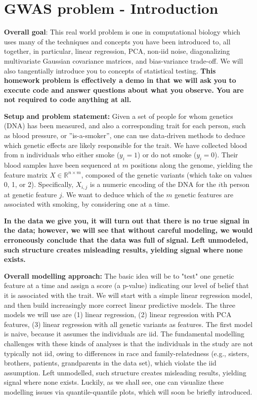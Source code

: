 \documentclass[11pt]{article}
\begin{document}
    \section{GWAS problem - Introduction}\label{gwas-problem---introduction}

    \textbf{Overall goal}: This real world problem is one in computational
biology which uses many of the techniques and concepts you have been
introduced to, all together, in particular, linear regression, PCA,
non-iid noise, diagonalizing multivariate Gaussian covariance matrices,
and bias-variance trade-off. We will also tangentially introduce you to
concepts of statistical testing.
\textbf{This homework problem is effectively a demo in that we will ask you to execute code and answer questions about what you observe. You are not required to code anything at all.}

\textbf{Setup and problem statement:} Given a set of people for whom
genetics (DNA) has been measured, and also a corresponding trait for
each person, such as blood pressure, or ''is-a-smoker'', one can use
data-driven methods to deduce which genetic effects are likely
responsible for the trait. We have collected blood from n individuals
who either smoke (\(y_i = 1\)) or do not smoke (\(y_i = 0\)). Their
blood samples have been sequenced at \(m\) positions along the genome,
yielding the feature matrix \(X \in \mathbb{R}^{n\times m}\), composed
of the genetic variants (which take on values 0, 1, or 2). Specifically,
\(X_{i,j}\) is a numeric encoding of the DNA for the \(i\)th person at
genetic feature \(j\). We want to deduce which of the \(m\) genetic
features are associated with smoking, by considering one at a time.

\textbf{In the data we give you, it will turn out that there is no true
signal in the data; however, we will see that without careful modeling,
we would erroneously conclude that the data was full of signal. Left
unmodeled, such structure creates misleading results, yielding signal
where none exists.}

\textbf{Overall modelling approach:} The basic idea will be to "test"
one genetic feature at a time and assign a score (a p-value) indicating
our level of belief that it is associated with the trait. We will start
with a simple linear regression model, and then build increasingly more
correct linear predictive models. The three models we will use are (1)
linear regression, (2) linear regression with PCA features, (3) linear
regression with all genetic variants as features. The first model is
naive, because it assumes the individuals are iid. The fundamental
modelling challenges with these kinds of analyses is that the
individuals in the study are not typically not iid, owing to differences
in race and family-relatedness (e.g., sisters, brothers, patients,
grandparents in the data set), which violate the iid assumption. Left
unmodelled, such structure creates misleading results, yielding signal
where none exists. Luckily, as we shall see, one can visualize these
modelling issues via quantile-quantile plots, which will soon be briefly
introduced.
\end{document}
